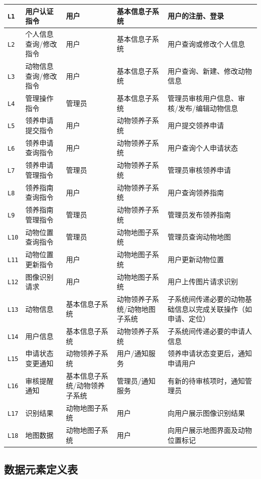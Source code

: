 \documentclass[12pt,a4paper,UTF8]{article}
\begin{document}
\begin{xltabular}{\linewidth}{
  |>{\centering\arraybackslash}m{1cm}
  |>{\centering\arraybackslash}m{3.5cm}
  |>{\centering\arraybackslash}m{3cm}
  |>{\centering\arraybackslash}m{3cm}
  |>{\centering\arraybackslash}m{5cm}|}
  \verb|L1| & 用户认证指令 & 用户 & 基本信息子系统 & 用户的注册、登录 \\ \hline
  \verb|L2| & 个人信息查询/修改指令 & 用户 & 基本信息子系统 & 用户查询或修改个人信息 \\ \hline
  \verb|L3| & 动物信息查询/修改指令 & 用户 & 基本信息子系统 & 用户查询、新建、修改动物信息 \\ \hline
  \verb|L4| & 管理操作指令 & 管理员 & 基本信息子系统 & 管理员审核用户信息、审核/发布/编辑动物信息 \\ \hline
  \verb|L5| & 领养申请提交指令 & 用户& 动物领养子系统 & 用户提交领养申请 \\ \hline
  \verb|L6| & 领养申请查询指令 & 用户 & 动物领养子系统 & 用户查询个人申请状态 \\ \hline
  \verb|L7| & 领养申请管理指令 & 管理员 & 动物领养子系统 & 管理员审核领养申请 \\ \hline
  \verb|L8| & 领养指南查询指令 & 用户 & 动物领养子系统 & 用户查询领养指南 \\ \hline
  \verb|L9| & 领养指南管理指令 & 管理员 & 动物领养子系统 & 管理员发布领养指南 \\ \hline
  \verb|L10| & 动物位置查询指令 & 管理员 & 动物地图子系统 & 管理员查询动物地图 \\ \hline
  \verb|L11| & 动物位置更新指令 & 用户 & 动物地图子系统 & 用户更新动物位置 \\ \hline
  \verb|L12| & 图像识别请求 & 用户 & 动物地图子系统 & 用户上传图片请求识别 \\ \hline
  \verb|L13| & 动物信息 & 基本信息子系统 & 动物领养子系统/动物地图子系统 & 子系统间传递必要的动物基础信息以完成关联操作（如申请、定位） \\ \hline
  \verb|L14| & 用户信息 & 基本信息子系统 & 动物领养子系统 & 子系统间传递必要的申请人信息 \\ \hline
  \verb|L15| & 申请状态变更通知 & 动物领养子系统 & 用户/通知服务 & 领养申请状态变更后，通知申请用户 \\ \hline
  \verb|L16| & 审核提醒通知 & 基本信息子系统/动物领养子系统 & 管理员/通知服务 & 有新的待审核项时，通知管理员 \\ \hline
  \verb|L17| & 识别结果 & 动物地图子系统 & 用户& 向用户展示图像识别结果 \\ \hline
  \verb|L18| & 地图数据 & 动物地图子系统 & 用户& 向用户展示地图界面及动物位置标记 \\ \hline
\end{xltabular}


\subsection{数据元素定义表}
\end{document}
